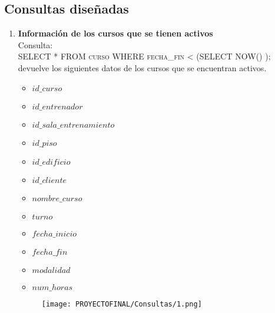 \documentclass[12pt,letterpaper]{article}
\begin{document}
\pagestyle{fancy}
\fancyhf{}
\fancyhead[C]{}
\rfoot{\thepage}
\begin{center}
   \section*{Consultas diseñadas} 
\end{center}

\begin{enumerate}
    \item \textbf{Información de los cursos que se tienen activos} \\
    Consulta:\\
    \textsc{ SELECT * FROM curso WHERE fecha\_fin < (SELECT NOW() );}\\devuelve los siguientes datos de los cursos que se encuentran activos.
\begin{itemize}
        \item $id\_curso$
        \item $id\_entrenador$
        \item $id\_sala\_entrenamiento$
        \item $id\_piso$
        \item $id\_edificio$
        \item $id\_cliente$
        \item $nombre\_curso$
        \item $turno$
        \item $fecha\_inicio$
        \item $fecha\_fin$
        \item $modalidad$
        \item $num\_horas$
    \end{itemize}
\begin{figure}[h!]
    \centering
    \texttt{[image: PROYECTOFINAL/Consultas/1.png]}
\end{figure}


\end{enumerate}
\end{document}

